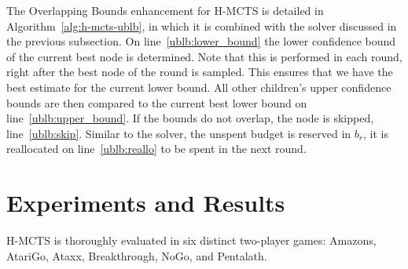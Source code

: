 \documentclass{kecsmstr}
\begin{document}
The Overlapping Bounds enhancement for H-MCTS is detailed in Algorithm~\ref{alg:h-mcts-ublb}, in which it is combined with the solver discussed in the previous subsection. On line~\ref{ublb:lower_bound} the lower confidence bound of the current best node is determined. Note that this is performed in each round, right after the best node of the round is sampled. This ensures that we have the best estimate for the current lower bound. All other children's upper confidence bounds are then compared to the current best lower bound on line~\ref{ublb:upper_bound}. If the bounds do not overlap, the node is skipped, line~\ref{ublb:skip}. Similar to the solver, the unspent budget is reserved in $b_r$, it is reallocated on line~\ref{ublb:reallo} to be spent in the next round.

\chapter{Experiments and Results}
\label{chap:experiments}
\begin{chaptercontents}
H-MCTS is thoroughly evaluated in six distinct two-player games: Amazons, AtariGo, Ataxx, Breakthrough, NoGo, and Pentalath.
\end{chaptercontents}
\end{document}
